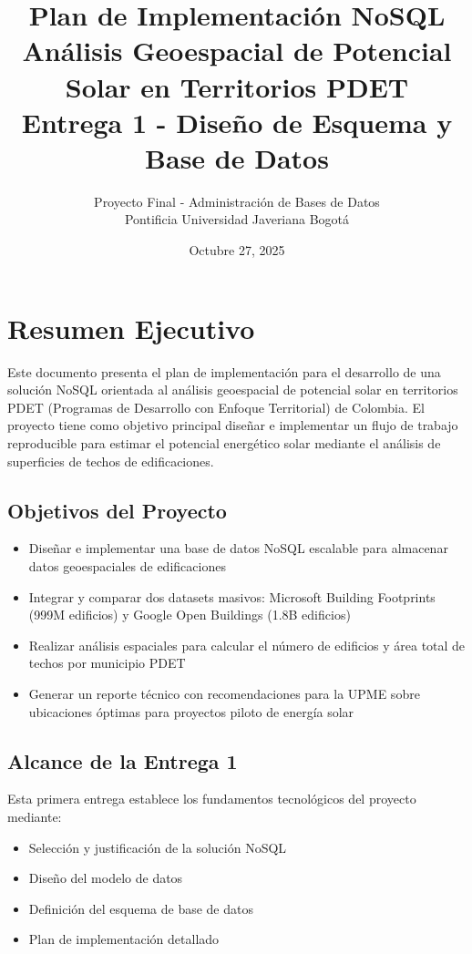 \documentclass[12pt,a4paper]{article}
\title{\textbf{Plan de Implementación NoSQL}\\
\Large{Análisis Geoespacial de Potencial Solar en Territorios PDET}\\
\large{Entrega 1 - Diseño de Esquema y Base de Datos}}
\author{Proyecto Final - Administración de Bases de Datos\\
Pontificia Universidad Javeriana Bogotá}
\date{Octubre 27, 2025}
\begin{document}
\maketitle
\thispagestyle{empty}
\newpage

\tableofcontents
\newpage

\section{Resumen Ejecutivo}

Este documento presenta el plan de implementación para el desarrollo de una solución NoSQL orientada al análisis geoespacial de potencial solar en territorios PDET (Programas de Desarrollo con Enfoque Territorial) de Colombia. El proyecto tiene como objetivo principal diseñar e implementar un flujo de trabajo reproducible para estimar el potencial energético solar mediante el análisis de superficies de techos de edificaciones.

\subsection{Objetivos del Proyecto}
\begin{itemize}[leftmargin=*]
    \item Diseñar e implementar una base de datos NoSQL escalable para almacenar datos geoespaciales de edificaciones
    \item Integrar y comparar dos datasets masivos: Microsoft Building Footprints (999M edificios) y Google Open Buildings (1.8B edificios)
    \item Realizar análisis espaciales para calcular el número de edificios y área total de techos por municipio PDET
    \item Generar un reporte técnico con recomendaciones para la UPME sobre ubicaciones óptimas para proyectos piloto de energía solar
\end{itemize}

\subsection{Alcance de la Entrega 1}
Esta primera entrega establece los fundamentos tecnológicos del proyecto mediante:
\begin{itemize}[leftmargin=*]
    \item Selección y justificación de la solución NoSQL
    \item Diseño del modelo de datos
    \item Definición del esquema de base de datos
    \item Plan de implementación detallado
\end{itemize}
\end{document}
